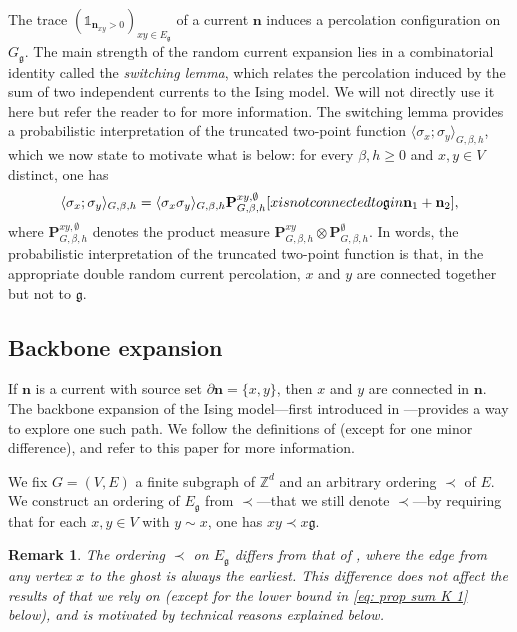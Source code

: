 \documentclass[10pt,a4paper]{amsart}
\numberwithin{equation}{section}
\newtheorem{Rem}[Thm]{Remark}
\newcommand\n{\mathbf{n}}
\newcommand\sn{\partial\mathbf{n}}
\newcommand\fg{\mathfrak{g}}
\begin{document}
The trace $(\mathds{1}_{\n_{xy}>0})_{xy \in E_\fg}$ of a current $\n$ induces a percolation configuration on $G_\fg$.   The main strength of the random current expansion lies in a combinatorial identity called the \emph{switching lemma}, which relates the percolation induced by the sum of two independent currents to the Ising model. We will not directly use it here but refer the reader to \cite{DuminilLecturesOnIsingandPottsModels2019,Panis2024applications} for more information. The switching lemma provides a probabilistic interpretation of the truncated two-point function $\langle \sigma_x;\sigma_y\rangle_{G,\beta,h}$, which we now state to motivate what is below: for every $\beta,h\geq 0$ and $x,y\in V$ distinct, one has
\begin{equation}\label{eq:switching for truncated}
	\langle \sigma_x;\sigma_y\rangle_{G,\beta,h}=\langle \sigma_x\sigma_y\rangle_{G,\beta,h}\mathbf P^{xy,\emptyset}_{G,\beta,h}[x \textup{ is not connected to }\fg\textup{ in }\n_1+\n_2],
\end{equation}
where $\mathbf P^{xy,\emptyset}_{G,\beta,h}$ denotes the product measure $\mathbf P^{xy}_{G,\beta,h}\otimes\mathbf P^{\emptyset}_{G,\beta,h}$. In words, the probabilistic interpretation of the truncated two-point function is that, in the appropriate double random current percolation, $x$ and $y$ are connected together but not to $\fg$.


\subsection{Backbone expansion}
If $\n$ is a current with source set $\sn=\{x,y\}$, then $x$ and $y$ are connected in $\n$. The backbone expansion of the Ising model---first introduced in \cite{AizenmanGeometricAnalysis1982}---provides a way to explore one such path.
We follow the definitions of \cite{AizenmanFernandezCriticalBehaviorMagnetization1986} (except for one minor difference), and refer to this paper for more information.

We fix $G=(V,E)$ a finite subgraph of $\mathbb Z^d$ and an arbitrary ordering $\prec$ of $E$. We construct an ordering of $E_\fg$ from $\prec$---that we still denote $\prec$---by requiring that for each $x,y\in V$ with $y\sim x$, one has $xy\prec x\fg$. 

\begin{Rem}
The ordering $\prec$ on $E_\fg$ differs from that of 
\cite{AizenmanFernandezCriticalBehaviorMagnetization1986}, where the edge 
from any vertex $x$ to the ghost is always the earliest. This difference 
does not affect the results of 
\cite{AizenmanFernandezCriticalBehaviorMagnetization1986} that we rely on (except for the lower bound in \eqref{eq: prop sum K 1} below), 
and is motivated by technical reasons explained below.
\end{Rem}
\end{document}
